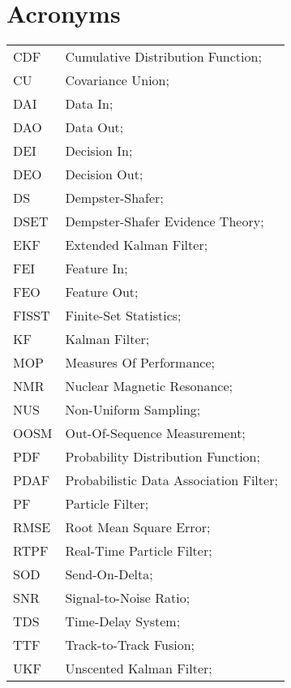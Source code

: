 \section*{Acronyms}
\begin{longtable}{ll}
	CDF			& Cumulative Distribution Function; \\
	CU			& Covariance Union; \\
	DAI			& Data In; \\
	DAO			& Data Out; \\
	DEI			& Decision In; \\
	DEO 		& Decision Out; \\
	DS			& Dempster-Shafer; \\
	DSET 		& Dempster-Shafer Evidence Theory; \\		
	EKF			& Extended Kalman Filter; \\
	FEI			& Feature In; \\
	FEO			& Feature Out; \\
	FISST		& Finite-Set Statistics; \\
	KF 			& Kalman Filter; \\
	MOP 		& Measures Of Performance; \\
	NMR 		& Nuclear Magnetic Resonance; \\
	NUS 		& Non-Uniform Sampling; \\ 
	OOSM 		& Out-Of-Sequence Measurement; \\
	PDF         & Probability Distribution Function; \\
	PDAF		& Probabilistic Data Association Filter; \\
	PF 			& Particle Filter; \\
	RMSE		& Root Mean Square Error; \\
	RTPF		& Real-Time Particle Filter; \\
	SOD			& Send-On-Delta; \\
	SNR			& Signal-to-Noise Ratio; \\
	TDS			& Time-Delay System; \\
	TTF 		& Track-to-Track Fusion; \\
	UKF			& Unscented Kalman Filter; \\
\end{longtable}

